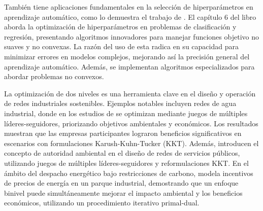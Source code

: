 También tiene aplicaciones fundamentales en la selección de hiperparámetros en aprendizaje automático, como lo demuestra el trabajo de \cite{DempeyZemkoho2020ML}. El capítulo 6 del libro aborda la optimización de hiperparámetros en problemas de clasificación y regresión, presentando algoritmos innovadores para manejar funciones objetivo no suaves y no convexas. La razón del uso de esta radica en su capacidad para minimizar errores en modelos complejos, mejorando así la precisión general del aprendizaje automático. Además, se implementan algoritmos especializados para abordar problemas no convexos.

La optimización de dos niveles es una herramienta clave en el diseño y operación de redes industriales sostenibles. Ejemplos notables incluyen redes de agua industrial, 
donde en los estudios de \cite{Ramos2016WaterII} se optimizan mediante juegos de múltiples líderes-seguidores, priorizando objetivos ambientales y económicos. Los resultados muestran que las empresas participantes lograron beneficios significativos en escenarios con formulaciones Karush-Kuhn-Tucker (KKT).
Además, \cite{Ramos2018UtilityNO} introducen el concepto de autoridad ambiental en el diseño de redes de servicios públicos, utilizando juegos de múltiples líderes-seguidores y reformulaciones KKT.
En el ámbito del despacho energético bajo restricciones de carbono, \cite{Gu2020BilevelOL} modela incentivos de precios de energía en un parque industrial, demostrando que un enfoque binivel puede simultáneamente mejorar el impacto ambiental y los beneficios económicos, utilizando un procedimiento iterativo primal-dual.


